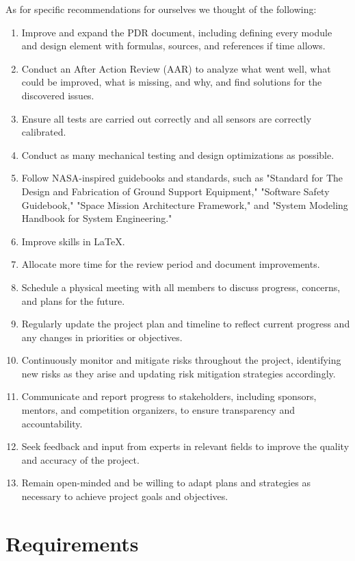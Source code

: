 \documentclass[11pt]{article}
\begin{document}
As for specific recommendations for ourselves we thought of the following:
\begin{enumerate}[leftmargin=1cm, itemindent=0.25cm, noitemsep, topsep=0pt]
\item Improve and expand the PDR document, including defining every module and design element with formulas, sources, and references if time allows.
\item Conduct an After Action Review (AAR) to analyze what went well, what could be improved, what is missing, and why, and find solutions for the discovered issues.
\item Ensure all tests are carried out correctly and all sensors are correctly calibrated.
\item Conduct as many mechanical testing and design optimizations as possible.
\item Follow NASA-inspired guidebooks and standards, such as "Standard for The Design and Fabrication of Ground Support Equipment," "Software Safety Guidebook," "Space Mission Architecture Framework," and "System Modeling Handbook for System Engineering."
\item Improve skills in LaTeX.
\item Allocate more time for the review period and document improvements.
\item Schedule a physical meeting with all members to discuss progress, concerns, and plans for the future.
\item Regularly update the project plan and timeline to reflect current progress and any changes in priorities or objectives.
\item Continuously monitor and mitigate risks throughout the project, identifying new risks as they arise and updating risk mitigation strategies accordingly.
\item Communicate and report progress to stakeholders, including sponsors, mentors, and competition organizers, to ensure transparency and accountability.
\item Seek feedback and input from experts in relevant fields to improve the quality and accuracy of the project.
\item Remain open-minded and be willing to adapt plans and strategies as necessary to achieve project goals and objectives.
\end{enumerate}

\section{Requirements}
\end{document}
